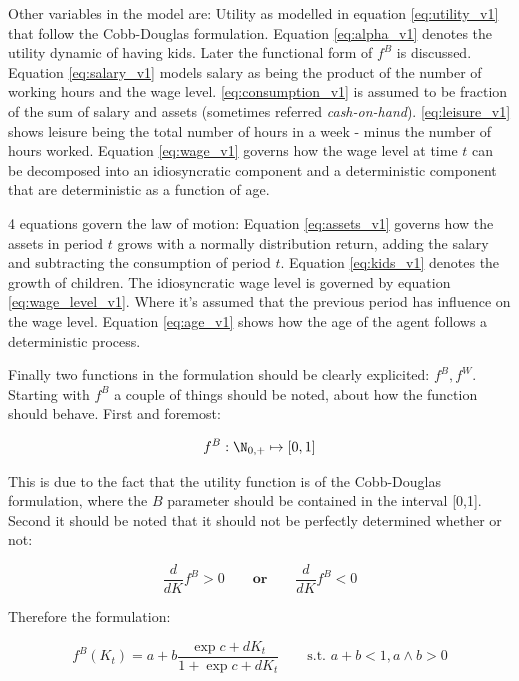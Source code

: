 Other variables in the model are: Utility as modelled in equation \eqref{eq:utility_v1} that follow the Cobb-Douglas formulation. Equation \eqref{eq:alpha_v1} denotes the utility dynamic of having kids. Later the functional form of $f^{B}$ is discussed. Equation \eqref{eq:salary_v1} models salary as being the product of the number of working hours and the wage level. \eqref{eq:consumption_v1} is assumed to be fraction of the sum of salary and assets (sometimes referred \textit{cash-on-hand}). \eqref{eq:leisure_v1} shows leisure being the total number of hours in a week - minus the number of hours worked. Equation \eqref{eq:wage_v1} governs how the wage level at time $t$ can be decomposed into an idiosyncratic component and a deterministic component that are deterministic as a function of age.

4 equations govern the law of motion: Equation \eqref{eq:assets_v1} governs how the assets in period $t$ grows with a normally distribution return, adding the salary and subtracting the consumption of period $t$. Equation \eqref{eq:kids_v1} denotes the growth of children. The idiosyncratic wage level is governed by equation \eqref{eq:wage_level_v1}. Where it's assumed that the previous period has influence on the wage level. Equation \eqref{eq:age_v1} shows how the age of the agent follows a deterministic process.

Finally two functions in the formulation should be clearly explicited: $f^{B}, f^{W}$. Starting with $f^{B}$ a couple of things should be noted, about how the function should behave. First and foremost:

\begin{equation}
    f^{B}: \N_{0,+} \mapsto [0,1]
\end{equation}

This is due to the fact that the utility function is of the Cobb-Douglas formulation, where the $B$ parameter should be contained in the interval [0,1]. Second it should be noted that it should not be perfectly determined whether or not:

\begin{equation}
    \frac{d}{d K}f^{B} > 0 \qquad \textbf{or} \qquad \frac{d}{d K}f^{B} < 0
\end{equation}

Therefore the formulation:

\begin{equation}
    f^{B} (K_t)= a + b \frac{\exp{c + d K_t}}{1 + \exp{c + d K_t}}\qquad  \text{s.t. } a + b < 1, a \land b > 0
\end{equation}

